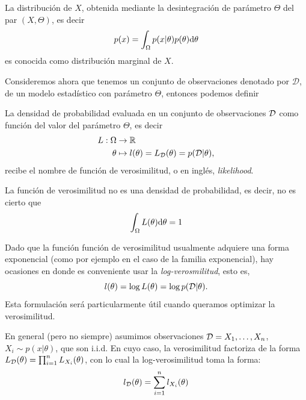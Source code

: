 \begin{definition}
La distribución de $X$, obtenida mediante la desintegración de parámetro $\Theta$ del par $(X,\Theta)$, es decir 
\begin{equation}
    p(x) = \int_\Omega p(x|\theta)p(\theta){\text{d}}\theta
\end{equation}
es conocida como distribución marginal de $X$.
\end{definition}

Consideremos ahora que tenemos un conjunto de observaciones denotado por $\mathcal{D}$, de un modelo estadístico con parámetro $\Theta$, entonces podemos definir

\begin{definition}
La densidad de probabilidad evaluada en un conjunto de observaciones ${\mathcal D}$ como función del valor del parámetro $\Theta$, es decir 
\begin{align}
    L: \Omega &\rightarrow {\mathbb R}\\
    \theta&\mapsto l(\theta) = L_{\mathcal D}(\theta) = p({\mathcal D}|\theta),
\end{align}
recibe el nombre de función de verosimilitud, o en inglés, \emph{likelihood}. 
\label{función_verosimilitud}
\end{definition}
\begin{remark}
La función de verosimilitud no es una densidad de probabilidad, es decir, no es cierto que
\begin{equation}
    \int_\Omega L(\theta){\text{d}}\theta = 1
\end{equation}
\end{remark}

\begin{remark}
Dado que la función función de verosimilitud usualmente adquiere una forma exponencial (como por ejemplo en el caso de la familia exponencial), hay ocasiones en donde es conveniente usar la \emph{log-verosmilitud}, esto es, 
\begin{equation}
l(\theta)=\log L(\theta)=\log p({\mathcal D}|\theta).
\end{equation}
Esta formulación será particularmente útil cuando queramos optimizar la verosimilitud. 
\end{remark}

\begin{remark}
En general (pero no siempre) asumimos observaciones ${\mathcal D} = {X_1,\ldots,X_n}$, $X_i\sim p(x|\theta)$, que son i.i.d. En cuyo caso, la verosimilitud factoriza de la forma $L_{\mathcal D}(\theta) = \prod_{i=1}^n L_{X_i}(\theta)$, con lo cual la log-verosimilitud toma la forma: 
\begin{equation}
l_{\mathcal D}(\theta) = \sum_{i=1}^nl_{X_i}(\theta)
\end{equation}
\end{remark}

